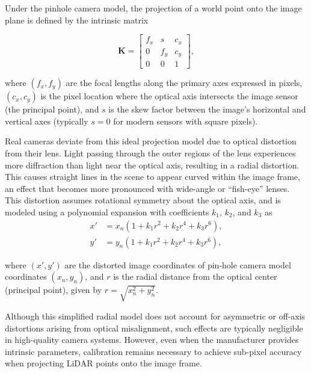 \documentclass{erauthesis}
\begin{document}
Under the pinhole camera model, the projection of a world point onto the image plane is defined by the intrinsic matrix %

\begin{equation}
    \mathbf{K} = 
    \begin{bmatrix}
        f_x & s & c_x \\
        0 & f_y & c_y \\
        0 & 0 & 1
    \end{bmatrix},
\end{equation}

where $(f_x, f_y)$ are the focal lengths along the primary axes expressed in pixels, $(c_x, c_y)$ is the pixel location where the optical axis intersects the image sensor (the principal point), and $s$ is the skew factor between the image’s horizontal and vertical axes (typically $s = 0$ for modern sensors with square pixels).

Real cameras deviate from this ideal projection model due to optical distortion from their lens.  
Light passing through the outer regions of the lens experiences more diffraction than light near the optical axis, resulting in a radial distortion.
This causes straight lines in the scene to appear curved within the image frame, an effect that becomes more pronounced with wide-angle or “fish-eye” lenses.  
This distortion assumes rotational symmetry about the optical axis, and is modeled using a polynomial expansion with coefficients $k_1$, $k_2$, and $k_3$ as
\begin{equation}
    \begin{split}
        x' &= x_n(1 + k_1 r^2 + k_2 r^4 + k_3 r^6), \\
        y' &= y_n(1 + k_1 r^2 + k_2 r^4 + k_3 r^6),
    \end{split}
\end{equation}

where $(x', y')$ are the distorted image coordinates of pin-hole camera model coordinates $(x_n, y_n)$, and $r$ is the radial distance from the optical center (principal point), given by $r = \sqrt{x_n^2 + y_n^2}$. 

Although this simplified radial model does not account for asymmetric or off-axis distortions arising from optical misalignment, such effects are typically negligible in high-quality camera systems.
However, even when the manufacturer provides intrinsic parameters, calibration remains necessary to achieve sub-pixel accuracy when projecting LiDAR points onto the image frame.
\end{document}
